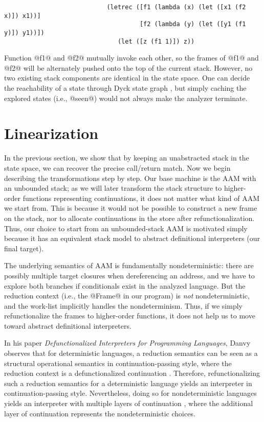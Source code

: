 \documentclass[acmsmall, screen]{acmart}\settopmatter{}
\begin{document}
\begin{lstlisting}
                            (letrec ([f1 (lambda (x) (let ([x1 (f2 x)]) x1))]
                                     [f2 (lambda (y) (let ([y1 (f1 y)]) y1))])
                               (let ([z (f1 1)]) z))
\end{lstlisting}

Function @f1@ and @f2@ mutually invoke each other, so the frames of @f1@ and @f2@ will be
alternately pushed onto the top of the current stack. However, no two existing stack
components are identical in the state space. One can decide the reachability of a state
through Dyck state graph \cite{earl2010pushdown, earl2012introspective}, but simply
caching the explored states (i.e., @seen@) would not always make the analyzer terminate.


\section{Linearization} \label{linear}

In the previous section, we show that by keeping an unabstracted stack in the state
space, we can recover the precise call/return match. Now we begin describing the
transformations step by step. Our base machine is the AAM with an unbounded
stack; as we will later transform the stack structure to higher-order functions
representing continuations, it does not matter what kind of AAM we start from.
This is because it would not be possible to construct a new frame on the stack, nor
to allocate continuations in the store after refunctionalization.
Thus, our choice to start from an unbounded-stack AAM is motivated simply because
it has an equivalent stack model to abstract definitional interpreters (our final target).

The underlying semantics of AAM is fundamentally nondeterministic: there are possibly
multiple target closures when dereferencing an address, and we have to explore both branches
if conditionals exist in the analyzed language. But the reduction context (i.e., the @Frame@ in
our program) is \emph{not} nondeterministic, and the work-list implicitly
handles the nondeterminism. Thus, if we simply refunctionalize the frames to higher-order
functions, it does not help us to move toward abstract definitional interpreters.

In his paper \textit{Defunctionalized Interpreters for Programming Languages},
Danvy observes that for deterministic languages, a reduction semantics can be seen as
a structural operational semantics in continuation-passing style, where the reduction context is
a defunctionalized continuation \cite{Danvy:2008:DIP:1411204.1411206}. Therefore,
refunctionalizing such a reduction semantics for a deterministic language yields
an interpreter in continuation-passing style.
Nevertheless, doing so for nondeterministic languages yields an interpreter
with multiple layers of continuation \cite{Danvy:2006:RW:2171265.2171268, DANVY2009534},
where the additional layer of continuation represents the nondeterministic choices.
\end{document}
